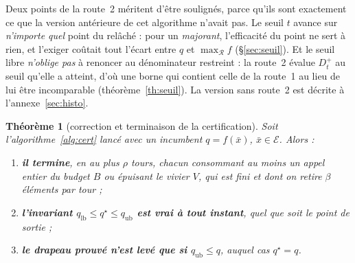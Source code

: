 \documentclass[11pt,a4paper]{article}
\theoremstyle{plain}
\newtheorem{theorem}{Théorème}
\theoremstyle{remark}
\newcommand{\Ecal}{\mathcal{E}}
\newcommand{\Rcal}{\mathcal{R}}
\newcommand{\qs}{q^{\star}}
\begin{document}
\noindent
Deux points de la route~2 méritent d'être soulignés, parce qu'ils sont
exactement ce que la version antérieure de cet algorithme n'avait pas.
Le seuil $t$ avance sur \emph{n'importe quel} point du relâché : pour un
\emph{majorant}, l'efficacité du point ne sert à rien, et l'exiger coûtait
tout l'écart entre $q$ et $\max_{\Rcal}f$ (\S\ref{sec:seuil}). Et le seuil
libre \emph{n'oblige pas} à renoncer au dénominateur restreint : la
route~2 évalue $D^{+}_{t}$ au seuil qu'elle a atteint, d'où une borne qui
contient celle de la route~1 au lieu de lui être incomparable
(théorème~\ref{th:seuil}). La version sans route~2 est décrite à
l'annexe~\ref{sec:histo}.

\begin{theorem}[correction et terminaison de la certification]
\label{th:global}
Soit l'algorithme~\ref{alg:cert} lancé avec un incumbent $q=f(\bar x)$,
$\bar x\in\Ecal$. Alors :
\begin{enumerate}[label=(\roman*),leftmargin=2.1em]
\item \textbf{il termine}, en au plus $\rho$ tours, chacun consommant au
  moins un appel entier du budget $B$ ou épuisant le vivier $V$, qui est
  fini et dont on retire $\beta$ éléments par tour ;
\item \textbf{l'invariant $q_{\text{lb}}\le\qs\le q_{\text{ub}}$ est vrai à
  tout instant}, quel que soit le point de sortie ;
\item \textbf{le drapeau \textsf{prouvé} n'est levé que si
  $q_{\text{ub}}\le q$}, auquel cas $\qs=q$.
\end{enumerate}
\end{theorem}
\end{document}
